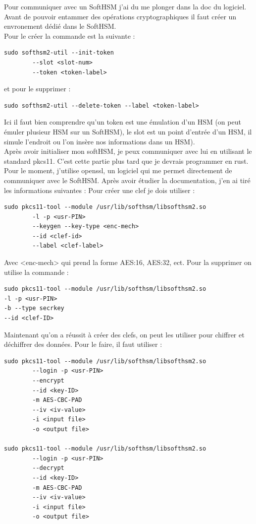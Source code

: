 \documentclass[a4paper, 12pt]{article}
\begin{document}
Pour communiquer avec un SoftHSM j'ai du me plonger dans la doc du logiciel. Avant de pouvoir entammer des opérations cryptographiques il faut créer un envronement dédié dans le SoftHSM. \\
Pour le créer la commande est la suivante :
\begin{verbatim}
sudo softhsm2-util --init-token 
		--slot <slot-num> 
		--token <token-label>
\end{verbatim}
et pour le supprimer :
\begin{verbatim}
sudo softhsm2-util --delete-token --label <token-label>
\end{verbatim}
Ici il faut bien comprendre qu'un token est une émulation d'un HSM (on peut émuler plusieur HSM sur un SoftHSM), le slot est un point d'entrée d'un HSM, il simule l'endroit ou l'on insère nos informations dans un HSM). \\
Après avoir initialiser mon softHSM, je peux communiquer avec lui en utilisant le standard pkcs11. C'est cette partie plus tard que je devrais programmer en rust. Pour le moment, j'utilise openssl, un logiciel qui me permet directement de communiquer avec le SoftHSM. Après avoir étudier la documentation, j'en ai tiré les informations suivantes :
Pour créer une clef je dois utiliser : 
\begin{verbatim}
sudo pkcs11-tool --module /usr/lib/softhsm/libsofthsm2.so 
		-l -p <usr-PIN> 
		--keygen --key-type <enc-mech> 
		--id <clef-id> 
		--label <clef-label>
\end{verbatim}
Avec <enc-mech> qui prend la forme AES:16, AES:32, ect. Pour la supprimer on utilise la commande : 
\begin{verbatim}
sudo pkcs11-tool --module /usr/lib/softhsm/libsofthsm2.so 
-l -p <usr-PIN> 
-b --type secrkey 
--id <clef-ID>
\end{verbatim}

Maintenant qu'on a réussit à créer des clefs, on peut les utiliser pour chiffrer et déchiffrer des données. Pour le faire, il faut utiliser :
\begin{verbatim}
sudo pkcs11-tool --module /usr/lib/softhsm/libsofthsm2.so 
		--login -p <usr-PIN> 
		--encrypt 
		--id <key-ID> 
		-m AES-CBC-PAD 
		--iv <iv-value> 
		-i <input file> 
		-o <output file>

sudo pkcs11-tool --module /usr/lib/softhsm/libsofthsm2.so 
		--login -p <usr-PIN> 
		--decrypt 
		--id <key-ID> 
		-m AES-CBC-PAD 
		--iv <iv-value> 
		-i <input file> 
		-o <output file>
\end{verbatim}
\end{document}
